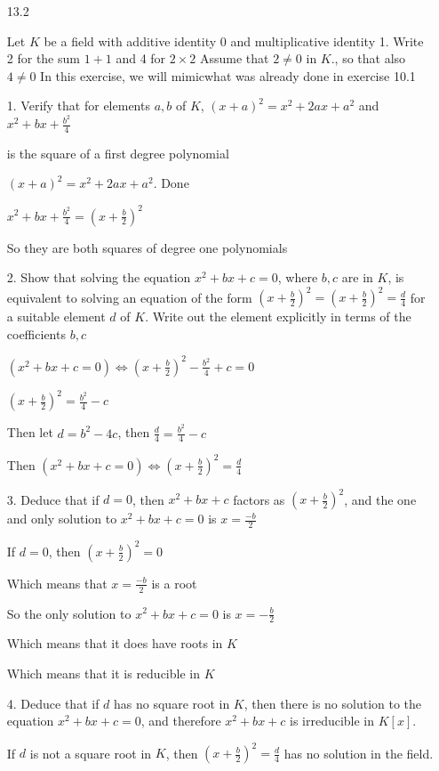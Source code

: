 \documentclass[12pt]{article}
\begin{document}
\begin{itemize}

\newpage
\item[13.2]

Let $K$ be a field with additive identity 0 and multiplicative identity 1. Write 2 for the sum $1+1$ and 4 for $2 \times 2$ Assume that $2\neq0$ in $K$., so that also $4\neq0$ In this exercise, we will mimicwhat was already done in exercise 10.1

		1. Verify that for elements $a,b$ of $K$, $(x+a)^2 = x^2 + 2ax + a^2$ and $x^2 + bx + \frac{b^2}{4}$

		is the square of a first degree polynomial

		$(x+a)^2 = x^2 + 2ax + a^2$. Done

		$x^2 + bx + \frac{b^2}{4} = (x + \frac{b}{2})^2$

		So they are both squares of degree one polynomials

		2. Show that solving the equation $x^2 + bx + c = 0$, where $b,c$ are in $K$, is equivalent to solving an equation of the form $(x+\frac{b}{2})^2 = (x+\frac{b}{2})^2 = \frac{d}{4}$ for a suitable element $d$ of $K$. Write out the element explicitly in terms of the coefficients $b,c$

		$(x^2 + bx + c = 0) \iff (x + \frac{b}{2})^2 - \frac{b^2}{4} + c = 0$

		$(x+\frac{b}{2})^2 = \frac{b^2}{4} - c$

		Then let $d = b^2 - 4c$, then $\frac{d}{4} = \frac{b^2}{4} - c$

		Then $(x^2 + bx + c = 0) \iff (x + \frac{b}{2})^2 = \frac{d}{4}$

		3. Deduce that if $d=0$, then $x^2 + bx + c$ factors as $(x+\frac{b}{2})^2$, and the one and only solution to $x^2 + bx + c = 0$ is $x = \frac{-b}{2}$

		If $d=0$, then $(x+\frac{b}{2})^2 = 0$

		Which means that $x = \frac{-b}{2}$ is a root

		So the only solution to $x^2 + bx + c = 0$ is $x = -\frac{b}{2}$

		Which means that it does have roots in $K$

		Which means that it is reducible in $K$

		4. Deduce that if $d$ has no square root in $K$, then there is no solution to the equation $x^2 + bx + c = 0$, and therefore $x^2 + bx + c$ is irreducible in $K[x]$.

		If $d$ is not a square root in $K$, then $(x+\frac{b}{2})^2 = \frac{d}{4}$ has no solution in the field.


\end{itemize}
\end{document}
